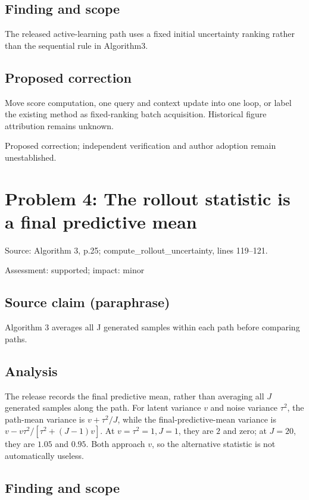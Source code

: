 \documentclass[11pt]{article}
\begin{document}
\subsection*{Finding and scope}

The released active-learning path uses a fixed initial uncertainty ranking rather than the sequential rule in Algorithm3.

\subsection*{Proposed correction}

Move score computation, one query and context update into one loop, or label the existing method as fixed-ranking batch acquisition. Historical figure attribution remains unknown.

Proposed correction; independent verification and author adoption remain unestablished.

\section*{Problem 4: The rollout statistic is a final predictive mean}

Source: Algorithm 3, p.25; compute\_rollout\_uncertainty, lines 119–121.

Assessment: supported; impact: minor

\subsection*{Source claim (paraphrase)}

Algorithm 3 averages all J generated samples within each path before comparing paths.

\subsection*{Analysis}

The release records the final predictive mean, rather than averaging all \(J\) generated samples along the path. For latent variance \(v\) and noise variance \(\tau^2\), the path-mean variance is \(v+\tau^2/J\), while the final-predictive-mean variance is \(v-v\tau^2/[\tau^2+(J-1)v]\). At \(v=\tau^2=1,J=1\), they are \(2\) and zero; at \(J=20\), they are \(1.05\) and \(0.95\). Both approach \(v\), so the alternative statistic is not automatically useless.

\subsection*{Finding and scope}
\end{document}
